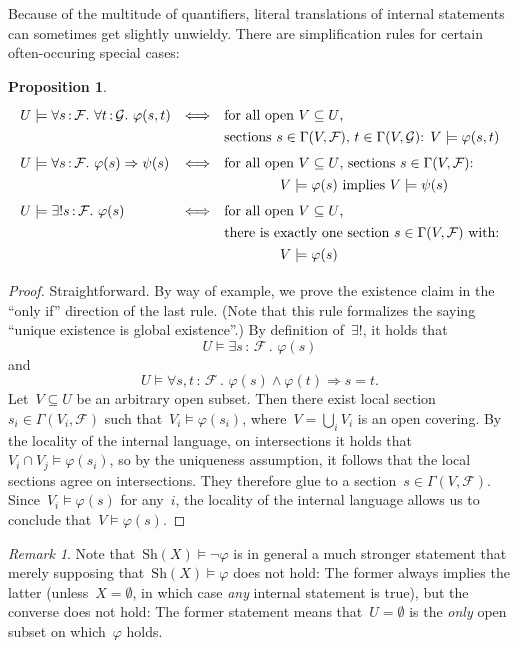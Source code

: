\documentclass[10pt]{amsart}
\theoremstyle{definition}
\theoremstyle{plain}
\newtheorem{prop}[defn]{Proposition}
\theoremstyle{remark}
\newtheorem{rem}[defn]{Remark}
\newcommand{\F}{\mathcal{F}}
\newcommand{\G}{\mathcal{G}}
\newcommand{\Sh}{\mathrm{Sh}}
\newcommand{\?}{\,{:}\,}
\renewcommand{\_}{\mathpunct{.}\,}
\begin{document}
Because of the multitude of quantifiers, literal translations of internal statements
can sometimes get slightly unwieldy. There are simplification rules for certain
often-occuring special cases:
\begin{prop}
    \[ \renewcommand{\arraystretch}{1.3}\begin{array}{@{}lcl@{}}
      U \models \forall s\?\F\_ \forall t\?\G\_ \varphi(s,t)
      &\Longleftrightarrow&
      \text{for all open~$V \subseteq U$,} \\
      && \text{sections~$s \in \Gamma(V,\F)$, $t \in \Gamma(V,\G)$:
      $V \models \varphi(s,t)$} \\[0.3em]
      U \models \forall s\?\F\_ \varphi(s) \Rightarrow \psi(s)
      &\Longleftrightarrow&
      \text{for all open~$V \subseteq U$, sections~$s \in \Gamma(V,\F)$:} \\
      &&\qquad\qquad \text{$V \models \varphi(s)$ implies $V \models \psi(s)$}
      \\[0.3em]
      U \models \exists!s\?\F\_ \varphi(s)
      &\Longleftrightarrow&
      \text{for all open~$V \subseteq U$,} \\
      &&
      \text{there is exactly one section~$s \in \Gamma(V,\F)$ with:} \\
      &&\qquad\qquad V \models \varphi(s)
    \end{array} \]
\end{prop}
\begin{proof}Straightforward. By way of example, we prove the existence claim
in the ``only if'' direction of the last rule. (Note that this rule formalizes
the saying ``unique existence is global existence''.) By definition of~$\exists!$, it
holds that
\[ U \models \exists s\?\F\_ \varphi(s) \]
and
\[ U \models \forall s,t\?\F\_ \varphi(s) \wedge \varphi(t) \Rightarrow s = t.  \]
Let~$V \subseteq U$ be an arbitrary open subset. Then there exist local
section~$s_i \in \Gamma(V_i,\F)$ such that~$V_i \models \varphi(s_i)$, where~$V
= \bigcup_i V_i$ is an open covering. By the locality of the internal language,
on intersections it holds that~$V_i \cap V_j \models \varphi(s_i)$, so by the
uniqueness assumption, it follows that the local sections agree on intersections.
They therefore glue to a section~$s \in \Gamma(V,\F)$. Since~$V_i \models
\varphi(s)$ for any~$i$, the locality of the internal language allows us to
conclude that~$V \models \varphi(s)$.
\end{proof}

\begin{rem}Note that~$\Sh(X) \models \neg\varphi$ is in general a much stronger
statement that merely supposing that~$\Sh(X) \models \varphi$ does not hold:
The former always implies the latter (unless~$X = \emptyset$, in which case
\emph{any} internal statement is true), but the converse does not hold: The
former statement means that~$U = \emptyset$ is the \emph{only} open subset on
which~$\varphi$ holds.\end{rem}
\end{document}
